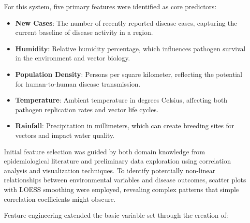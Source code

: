 \documentclass[12pt,a4paper]{report}
\begin{document}
For this system, five primary features were identified as core predictors:

\begin{itemize}
    \item \textbf{New Cases}: The number of recently reported disease cases, capturing the current baseline of disease activity in a region.
    \item \textbf{Humidity}: Relative humidity percentage, which influences pathogen survival in the environment and vector biology.
    \item \textbf{Population Density}: Persons per square kilometer, reflecting the potential for human-to-human disease transmission.
    \item \textbf{Temperature}: Ambient temperature in degrees Celsius, affecting both pathogen replication rates and vector life cycles.
    \item \textbf{Rainfall}: Precipitation in millimeters, which can create breeding sites for vectors and impact water quality.
\end{itemize}

Initial feature selection was guided by both domain knowledge from epidemiological literature and preliminary data exploration using correlation analysis and visualization techniques. To identify potentially non-linear relationships between environmental variables and disease outcomes, scatter plots with LOESS smoothing were employed, revealing complex patterns that simple correlation coefficients might obscure.

Feature engineering extended the basic variable set through the creation of:
\end{document}
